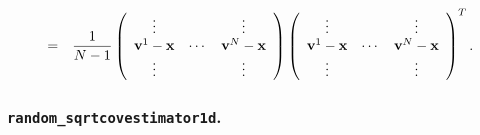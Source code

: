 \documentclass[12pt]{article}
\begin{document}
\begin{itemize}
\begin{eqnarray}
& = & \frac{1}{N-1} \left( \begin{array}{ccc} \vdots & & \vdots \\ {\bf v}^1 - {\bf x} & \cdots & {\bf v}^N - {\bf x} \\ \vdots & & \vdots \end{array} \right) \left( \begin{array}{ccc} \vdots & & \vdots \\ {\bf v}^1 - {\bf x} & \cdots & {\bf v}^N - {\bf x} \\ \vdots & & \vdots \end{array} \right)^T.
\end{eqnarray}
\end{itemize} 

\subsubsection{{\tt random\_sqrtcovestimator1d}.}
\end{document}

